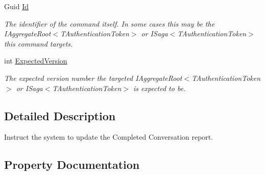 \begin{DoxyCompactItemize}
Guid \hyperlink{classCqrs_1_1Akka_1_1Tests_1_1Unit_1_1Commands_1_1UpdateCompletedConversationReportCommand_ae04217f6bfc19727e462f0077b990b34_ae04217f6bfc19727e462f0077b990b34}{Id}
\begin{DoxyCompactList}\small\item\em The identifier of the command itself. In some cases this may be the I\+Aggregate\+Root$<$\+T\+Authentication\+Token$>$ or I\+Saga$<$\+T\+Authentication\+Token$>$ this command targets. \end{DoxyCompactList}\item 
int \hyperlink{classCqrs_1_1Akka_1_1Tests_1_1Unit_1_1Commands_1_1UpdateCompletedConversationReportCommand_a9e691733ed2512c198da8ad934bd79cb_a9e691733ed2512c198da8ad934bd79cb}{Expected\+Version}
\begin{DoxyCompactList}\small\item\em The expected version number the targeted I\+Aggregate\+Root$<$\+T\+Authentication\+Token$>$ or I\+Saga$<$\+T\+Authentication\+Token$>$ is expected to be. \end{DoxyCompactList}\end{DoxyCompactItemize}


\subsection{Detailed Description}
Instruct the system to update the Completed Conversation report. 



\subsection{Property Documentation}
\mbox{\label{classCqrs_1_1Akka_1_1Tests_1_1Unit_1_1Commands_1_1UpdateCompletedConversationReportCommand_acd3a75723758c361da638f40fab6d574_acd3a75723758c361da638f40fab6d574}} 
